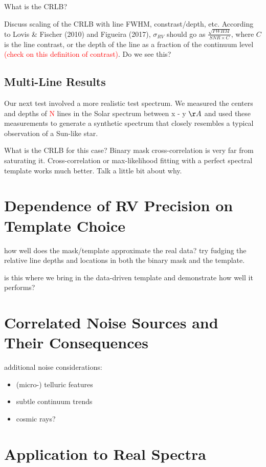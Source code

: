 \documentclass[modern]{aastex61}
\newcommand\todo[1]{\textcolor{red}{#1}}  %
\begin{document}
What is the CRLB?

Discuss scaling of the CRLB with line FWHM, constrast/depth, etc. According to Lovis \& Fischer (2010) and Figueira (2017), $\sigma_{RV}$ should go as $\frac{\sqrt{FWHM}}{SNR \times C}$, where $C$ is the line contrast, or the depth of the line as a fraction of the continuum level \todo{(check on this definition of contrast)}. Do we see this?

\subsection{Multi-Line Results}

Our next test involved a more realistic test spectrum. We measured the centers and depths of \todo{N} lines in the Solar spectrum between {x - y} $\AA$ and used these measurements to generate a synthetic spectrum that closely resembles a typical observation of a Sun-like star.

What is the CRLB for this case? Binary mask cross-correlation is very far from saturating it. Cross-correlation or max-likelihood fitting with a perfect spectral template works much better. Talk a little bit about why.

\section{Dependence of RV Precision on Template Choice}

how well does the mask/template approximate the real data? try fudging the relative line depths and locations in both the binary mask and the template.

is this where we bring in the data-driven template and demonstrate how well it performs?

\section{Correlated Noise Sources and Their Consequences}

additional noise considerations:
\begin{itemize}
\item (micro-) telluric features
\item subtle continuum trends
\item cosmic rays?
\end{itemize}

\section{Application to Real Spectra}
\end{document}
